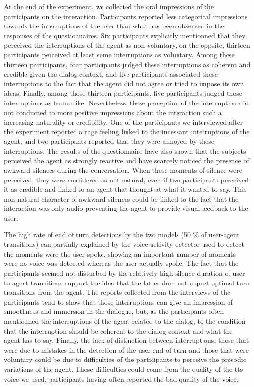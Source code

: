 At the end of the experiment, we collected the oral impressions of the participants on the interaction. Participants reported less categorical impressions towards the interruptions of the user than what has been observed in the responses of the questionnaires. Six participants explicitly mentionned that they perceived the interruptions of the agent as non-voluntary, on the oppsite, thirteen participants perceived at least some interruptions as voluntary. Among these thirteen participants, four participants judged these interruptions as coherent and credible given the dialog context, and five participants associated these interruptions to the fact that the agent did not agree or tried to impose its own ideas. Finally, among those thirteen participants, five participants judged those interruptions as humanlike. Nevertheless, these perception of the interruption did not conducted to more positive impressions about the interaction such a increasing naturality or credibility. One of the participants we interviewed after the experiment reported a rage feeling linked to the incessant interruptions of the agent, and two participants reported that they were annoyed by these interruptions. The results of the questionnaire have also shown that the subjects perceived the agent as strongly reactive and have scarcely noticed the presence of awkward silences during the conversation. When these moments of silence were perceived, they were considered as not natural, even if two participants perceived it as credible and linked to an agent that thought at what it wanted to say. This non natural character of awkward silences could be linked to the fact that the interaction was only audio preventing the agent to provide visual feedback to the user. 

The high rate of end of turn detections by the two models (50 \% of user-agent transitions) can partially explained by the voice activity detector used to detect the moments were the user spoke, showing an important number of moments were no voice was detected whereas the user actually spoke. The fact that the participants seemed not disturbed by the relatively high silence duration of user to agent transitions support the idea that the latter does not expect optimal turn transitions from the agent. The reports collected from the interviews of the participants tend to show that those interruptions can give an impression of smoothness and immersion in the dialogue, but, as the participants often mentionned the interruptions of the agent related to the dialog, to the condition that the interruption should be coherent to the dialog context and what the agent has to say. Finally, the lack of distinction between interruptions, those that were due to mistakes in the detection of the user end of turn and those that were voluntary could be due to difficulties of the participants to perceive the prosodic variations of the agent. These difficulties could come from the quality of the tts voice we used, participants having often reported the bad quality of the voice. 

